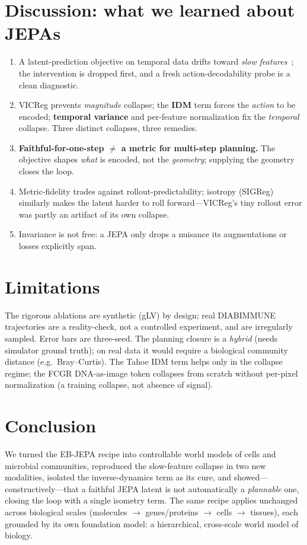 \documentclass[10pt,twocolumn]{article}
\begin{document}
\section{Discussion: what we learned about JEPAs}
\label{sec:discussion}
\begin{enumerate}[leftmargin=1.3em,itemsep=1pt,topsep=2pt]
\item A latent-prediction objective on temporal data drifts toward \emph{slow features}~\cite{slowfeat};
  the intervention is dropped first, and a fresh action-decodability probe is a clean diagnostic.
\item VICReg prevents \emph{magnitude} collapse; the \textbf{IDM} term forces the \emph{action} to be
  encoded; \textbf{temporal variance} and per-feature normalization fix the \emph{temporal} collapse.
  Three distinct collapses, three remedies.
\item \textbf{Faithful-for-one-step $\neq$ a metric for multi-step planning.} The objective shapes
  \emph{what} is encoded, not the \emph{geometry}; supplying the geometry closes the loop.
\item Metric-fidelity trades against rollout-predictability; isotropy (SIGReg) similarly makes the latent
  harder to roll forward---VICReg's tiny rollout error was partly an artifact of its own collapse.
\item Invariance is not free: a JEPA only drops a nuisance its augmentations or losses explicitly span.
\end{enumerate}

\section{Limitations}
The rigorous ablations are synthetic (gLV) by design; real DIABIMMUNE trajectories are a reality-check,
not a controlled experiment, and are irregularly sampled. Error bars are three-seed. The planning
closure is a \emph{hybrid} (needs simulator ground truth); on real data it would require a biological
community distance (e.g.\ Bray--Curtis). The Tahoe IDM term helps only in the collapse regime; the
FCGR DNA-as-image token collapses from scratch without per-pixel normalization (a training collapse, not
absence of signal).

\section{Conclusion}
We turned the EB-JEPA recipe into controllable world models of cells and microbial communities,
reproduced the slow-feature collapse in two new modalities, isolated the inverse-dynamics term as its
cure, and showed---constructively---that a faithful JEPA latent is not automatically a \emph{plannable}
one, closing the loop with a single isometry term. The same recipe applies unchanged across biological
scales (molecules $\to$ genes/proteins $\to$ cells $\to$ tissues), each grounded by its own foundation
model: a hierarchical, cross-scale world model of biology.
\end{document}

